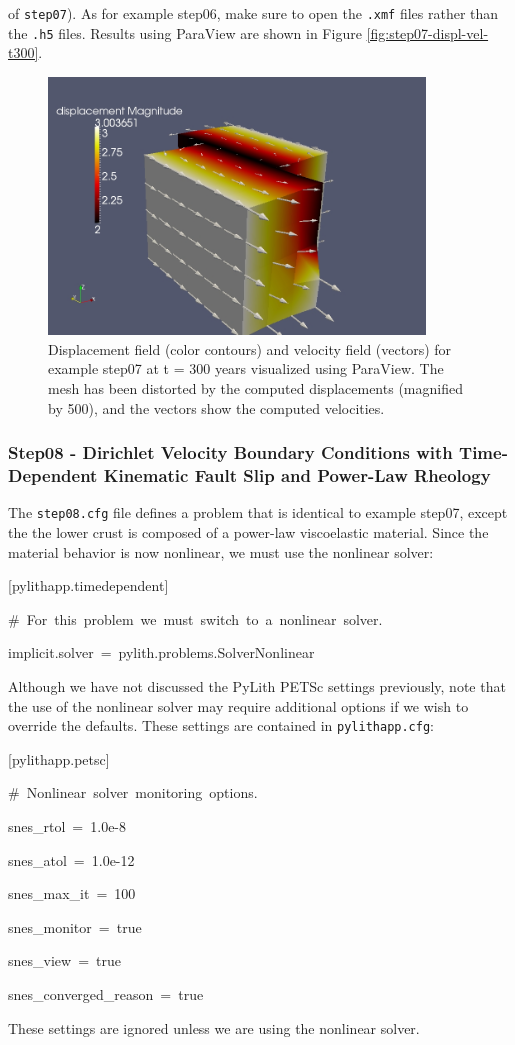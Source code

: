 of \texttt{step07}). As for example step06, make sure to open the
\texttt{.xmf} files rather than the \texttt{.h5} files. Results using
ParaView are shown in Figure \vref{fig:step07-displ-vel-t300}.
\begin{figure}
\centering{}\includegraphics[width=10cm]{tutorials/3dhex8/figs/step07-displ-vel-t300}\caption{Displacement field (color contours) and velocity field (vectors) for
example step07 at t = 300 years visualized using ParaView. The mesh
has been distorted by the computed displacements (magnified by 500),
and the vectors show the computed velocities.\label{fig:step07-displ-vel-t300}}
\end{figure}



\subsubsection{Step08 - Dirichlet Velocity Boundary Conditions with Time-Dependent
Kinematic Fault Slip and Power-Law Rheology\label{sub:Tutorial-Step08-Power-law}}

The \texttt{step08.cfg} file defines a problem that is identical to
example step07, except the the lower crust is composed of a power-law
viscoelastic material. Since the material behavior is now nonlinear,
we must use the nonlinear solver:
\begin{lyxcode}
{[}pylithapp.timedependent{]}

\#~For~this~problem~we~must~switch~to~a~nonlinear~solver.

implicit.solver~=~pylith.problems.SolverNonlinear
\end{lyxcode}
Although we have not discussed the PyLith PETSc settings previously,
note that the use of the nonlinear solver may require additional options
if we wish to override the defaults. These settings are contained
in \texttt{pylithapp.cfg}:
\begin{lyxcode}
{[}pylithapp.petsc{]}

\#~Nonlinear~solver~monitoring~options.

snes\_rtol~=~1.0e-8

snes\_atol~=~1.0e-12

snes\_max\_it~=~100

snes\_monitor~=~true

snes\_view~=~true

snes\_converged\_reason~=~true
\end{lyxcode}
These settings are ignored unless we are using the nonlinear solver.

